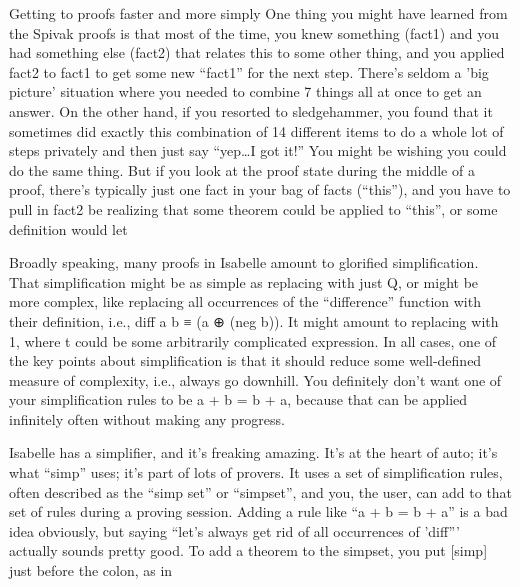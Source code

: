 Getting to proofs faster and more simply
One thing you might have learned from the Spivak proofs is that most of the time, you knew something (fact1) and you had something else (fact2) that relates this to some other thing, and you applied fact2 to fact1 to get some new ``fact1'' for the next step. There's seldom a 'big picture' situation where you needed to combine 7 things all at once to get an answer. On the other hand, if you resorted to sledgehammer, you found that it sometimes did exactly this combination of 14 different items to do a whole lot of steps privately and then just say ``yep\ldots I got it!'' You might be wishing you could do the same thing. But if you look at the proof state during the middle of a proof, there's typically just one fact in your bag of facts (``this''), and you have to pull in fact2 be realizing that some theorem could be applied to ``this'', or some definition would let %


Broadly speaking, many proofs in Isabelle amount to glorified simplification. That simplification might be as simple as replacing  with just Q, or might be more complex, like replacing all occurrences of the ``difference'' function with their definition, i.e., diff a b ≡ (a ⊕ (neg b)). It might amount to replacing  with 1, where t could be some arbitrarily complicated expression. In all cases, one of the key points about simplification is that it should reduce some well-defined measure of complexity, i.e., always go downhill. You definitely don't want one of your simplification rules to be a + b = b + a, because that can be applied infinitely often without making any progress. 

Isabelle has a simplifier, and it's freaking amazing. It's at the heart of auto; it's what ``simp'' uses; it's part of lots of provers. It uses a set of simplification rules, often described as the ``simp set'' or ``simpset'', and you, the user, can add to that set of rules during a proving session. Adding a rule like ``a + b = b + a'' is a bad idea obviously, but saying ``let's always get rid of all occurrences of 'diff''' actually sounds pretty good. To add a theorem to the simpset, you put [simp] just before the colon, as in 


